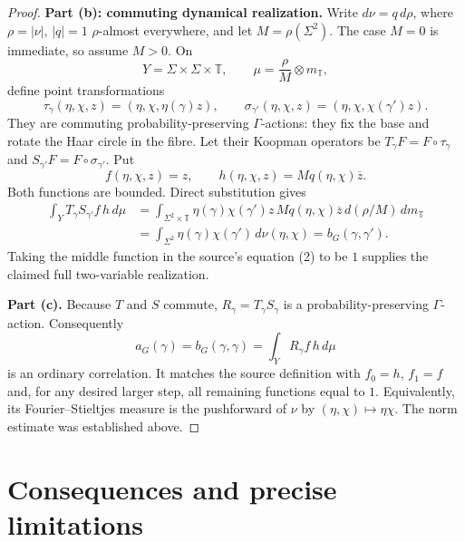 \documentclass[11pt]{article}
\newcommand{\T}{\mathbb T}
\begin{document}
\begin{proof}
\medskip
\noindent\textbf{Part (b): commuting dynamical realization.}
Write $d\nu=q\,d\rho$, where $\rho=|\nu|$, $|q|=1$ $\rho$-almost everywhere,
and let $M=\rho(\Sigma^2)$.  The case $M=0$ is immediate, so assume $M>0$.
On
\[
 Y=\Sigma\times\Sigma\times\T,
 \qquad
 \mu=\frac{\rho}{M}\otimes m_{\T},
\]
define point transformations
\[
 \tau_\gamma(\eta,\chi,z)=(\eta,\chi,\eta(\gamma)z),
 \qquad
 \sigma_{\gamma'}(\eta,\chi,z)=(\eta,\chi,\chi(\gamma')z).
\]
They are commuting probability-preserving $\Gamma$-actions: they fix the base
and rotate the Haar circle in the fibre.  Let their Koopman operators be
$T_\gamma F=F\circ\tau_\gamma$ and
$S_{\gamma'}F=F\circ\sigma_{\gamma'}$.  Put
\[
 f(\eta,\chi,z)=z,
 \qquad h(\eta,\chi,z)=M q(\eta,\chi)\overline z.
\]
Both functions are bounded.  Direct substitution gives
\begin{align*}
 \int_Y T_\gamma S_{\gamma'}f\,h\,d\mu
 &=\int_{\Sigma^2\times\T}
     \eta(\gamma)\chi(\gamma')z\,M q(\eta,\chi)\overline z
     \,d(\rho/M)\,dm_\T\\
 &=\int_{\Sigma^2}\eta(\gamma)\chi(\gamma')\,d\nu(\eta,\chi)
 =b_G(\gamma,\gamma').
\end{align*}
Taking the middle function in the source's equation (2) to be $1$ supplies
the claimed full two-variable realization.

\medskip
\noindent\textbf{Part (c).}
Because $T$ and $S$ commute, $R_\gamma=T_\gamma S_\gamma$ is a
probability-preserving $\Gamma$-action.  Consequently
\[
 a_G(\gamma)=b_G(\gamma,\gamma)=\int_Y R_\gamma f\,h\,d\mu
\]
is an ordinary correlation.  It matches the source definition with
$f_0=h$, $f_1=f$ and, for any desired larger step, all remaining functions
equal to $1$.  Equivalently, its Fourier--Stieltjes measure is the pushforward
of $\nu$ by $(\eta,\chi)\mapsto\eta\chi$.  The norm estimate was established
above.
\end{proof}

\section{Consequences and precise limitations}
\end{document}

